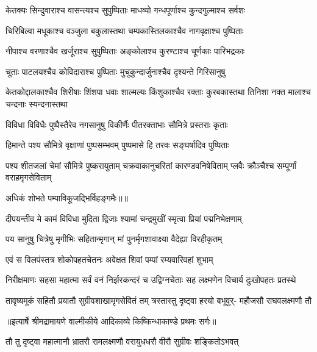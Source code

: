 \twolineshloka
{केतक्यः सिन्दुवाराश्च वासन्त्यश्च सुपुष्पिताः}
{माधव्यो गन्धपूर्णाश्च कुन्दगुल्माश्च सर्वशः} %

\twolineshloka
{चिरिबिल्वा मधूकाश्च वञ्जुला बकुलास्तथा}
{चम्पकास्तिलकाश्चैव नागवृक्षाश्च पुष्पिताः} %

\twolineshloka
{नीपाश्च वरणाश्चैव खर्जूराश्च सुपुष्पिताः}
{अङ्कोलाश्च कुरण्टाश्च चूर्णकाः पारिभद्रकाः} %

\twolineshloka
{चूताः पाटलयश्चैव कोविदाराश्च पुष्पिताः}
{मुचुकुन्दार्जुनाश्चैव दृश्यन्ते गिरिसानुषु} %

\threelineshloka
{केतकोद्दालकाश्चैव शिरीषाः शिंशपा धवाः}
{शाल्मल्यः किंशुकाश्चैव रक्ताः कुरबकास्तथा}
{तिनिशा नक्त मालाश्च चन्दनाः स्यन्दनास्तथा} %

\twolineshloka
{विविधा विविधैः पुष्पैस्तैरेव नगसानुषु}
{विकीर्णैः पीतरक्ताभाः सौमित्रे प्रस्तराः कृताः} %

\twolineshloka
{हिमान्ते पश्य सौमित्रे वृक्षाणां पुष्पसम्भवम्}
{पुष्पमासे हि तरवः सङ्घर्षादिव पुष्पिताः} %

\threelineshloka
{पश्य शीतजलां चेमां सौमित्रे पुष्करायुताम्}
{चक्रवाकानुचरितां कारण्डवनिषेविताम्}
{प्लवैः क्रौञ्चैश्च सम्पूर्णां वराहमृगसेविताम्} %

{अधिकं शोभते पम्पाविकूजद्भिर्विहङ्गमैः॥॥} %

\addtocounter{shlokacount}{1}

\twolineshloka
{दीपयन्तीव मे कामं विविधा मुदिता द्विजाः}
{श्यामां चन्द्रमुखीं स्मृत्वा प्रियां पद्मनिभेक्षणाम्} %

\twolineshloka
{पय सानुषु चित्रेषु मृगीभिः सहितान्मृगान्}
{मां पुनर्मृगशावाक्ष्या वैदेह्या विरहीकृतम्} %

\twolineshloka
{एवं स विलपंस्तत्र शोकोपहतचेतनः}
{अवेक्षत शिवां पम्पां रम्यवारिवहां शुभाम्} %

\fourlineindentedshloka
{निरीक्षमाणः सहसा महात्मा}
{सर्वं वनं निर्झरकन्दरं च}
{उद्विग्नचेताः सह लक्ष्मणेन}
{विचार्य दुःखोपहतः प्रतस्थे} %

\fourlineindentedshloka
{तावृष्यमूकं सहितौ प्रयातौ}
{सुग्रीवशाखामृगसेवितं तम्}
{त्रस्तास्तु दृष्ट्वा हरयो बभूवुर्-}
{महौजसौ राघवलक्ष्मणौ तौ} %


{॥इत्यार्षे श्रीमद्रामायणे वाल्मीकीये आदिकाव्ये किष्किन्धाकाण्डे प्रथमः सर्गः॥}


\twolineshloka
{तौ तु दृष्ट्वा महात्मानौ भ्रातरौ रामलक्ष्मणौ}
{वरायुधधरौ वीरौ सुग्रीवः शङ्कितोऽभवत्} %


